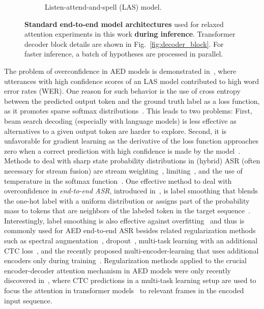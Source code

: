 \documentclass{article}
\begin{document}
\begin{figure*}[t!]
\begin{subfigure}[b]{0.48\textwidth}
\vspace{-2mm}
		\caption{Listen-attend-and-spell (LAS) model.}\label{fig:LAS}
		
	\end{subfigure}\vspace{-3mm}
	\caption{\textbf{Standard end-to-end model architectures} used for relaxed attention experiments in this work \textbf{during inference}. Transformer decoder block details are shown in Fig.~\ref{fig:decoder_block}. For faster inference, a batch of  hypotheses are processed in parallel.}
	\vspace{-5mm}
	\label{fig:models}
\end{figure*}

The problem of overconfidence in AED models is demonstrated in~\cite{Li2021}, where utterances with high confidence scores of an LAS model contributed to high word error rates (WER). One reason for such behavior is the use of cross entropy between the predicted output token and the ground truth label as a loss function, as it promotes sparse softmax distributions~\cite{pereyra2017}. This leads to two problems: First, beam search decoding (especially with language models) is less effective as alternatives to a given output token are harder to explore. Second, it is unfavorable for gradient learning as the derivative of the loss function approaches zero when a correct prediction with high confidence is made by the model~\cite{Chorowski2017}. Methods to deal with sharp state probability distributions in (hybrid) ASR (often necessary for stream fusion) are stream weighting~\cite{Receveur2016,Abdelaziz2018,Abdelaziz2015}, limiting~\cite{Lohrenz2017}, and the use of temperature in the softmax function~\cite{Hinton2014,Chorowski2017}. One effective method to deal with overconfidence in \textit{end-to-end ASR}, introduced in~\cite{Szegedy2016}, is label smoothing that blends the one-hot label with a uniform distribution or assigns part of the probability mass to tokens that are neighbors of the labeled token in the target sequence~\cite{Chorowski2017}. Interestingly, label smoothing is also effective against overfitting~\cite{Mueller2020} and thus is commonly used for AED end-to-end ASR besides related regularization methods such as spectral augmentation~\cite{Park2019d}, dropout~\cite{Nitish2014}, multi-task learning with an additional CTC loss~\cite{Kim2017,moriya2020}, and the recently proposed multi-encoder-learning that uses additional encoders only during training~\cite{Lohrenz2021}. Regularization methods applied to the crucial encoder-decoder attention mechanism in AED models were only recently discovered in~\cite{Chen2021}, where CTC predictions in a multi-task learning setup are used to focus the attention in transformer models~\cite{Chen2021} to relevant frames in the encoded input sequence.
\end{document}
